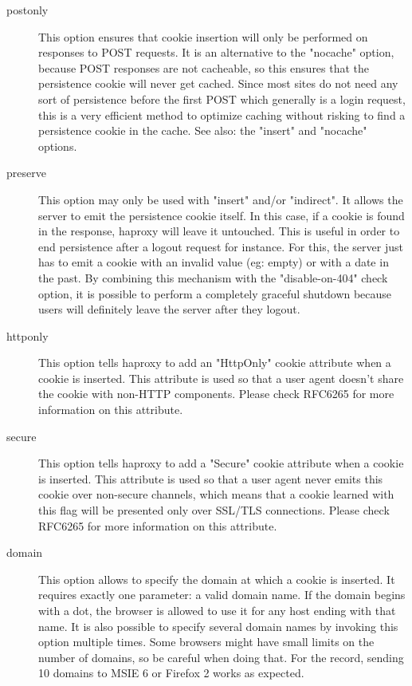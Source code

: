 \begin{description}
  \item[postonly]
              This option ensures that cookie insertion will only be performed
              on responses to POST requests. It is an alternative to the
              "nocache" option, because POST responses are not cacheable, so
              this ensures that the persistence cookie will never get cached.
              Since most sites do not need any sort of persistence before the
              first POST which generally is a login request, this is a very
              efficient method to optimize caching without risking to find a
              persistence cookie in the cache.
              See also: the "insert" and "nocache" options.

  \item[preserve]
              This option may only be used with "insert" and/or "indirect". It
              allows the server to emit the persistence cookie itself. In this
              case, if a cookie is found in the response, haproxy will leave it
              untouched. This is useful in order to end persistence after a
              logout request for instance. For this, the server just has to
              emit a cookie with an invalid value (eg: empty) or with a date in
              the past. By combining this mechanism with the "disable-on-404"
              check option, it is possible to perform a completely graceful
              shutdown because users will definitely leave the server after
              they logout.

  \item[httponly]
              This option tells haproxy to add an "HttpOnly" cookie attribute
              when a cookie is inserted. This attribute is used so that a
              user agent doesn't share the cookie with non-HTTP components.
              Please check RFC6265 for more information on this attribute.

  \item[secure]
              This option tells haproxy to add a "Secure" cookie attribute when
              a cookie is inserted. This attribute is used so that a user agent
              never emits this cookie over non-secure channels, which means
              that a cookie learned with this flag will be presented only over
              SSL/TLS connections. Please check RFC6265 for more information on
              this attribute.

  \item[domain]
              This option allows to specify the domain at which a cookie is
              inserted. It requires exactly one parameter: a valid domain
              name. If the domain begins with a dot, the browser is allowed to
              use it for any host ending with that name. It is also possible to
              specify several domain names by invoking this option multiple
              times. Some browsers might have small limits on the number of
              domains, so be careful when doing that. For the record, sending
              10 domains to MSIE 6 or Firefox 2 works as expected.


\end{description}
